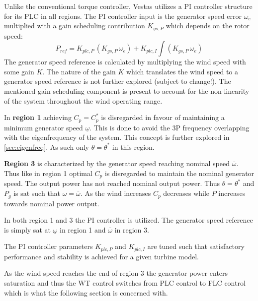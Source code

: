 \medskip
Unlike the conventional torque controller, Vestas utilizes a PI controller structure for its PLC in all regions. The PI controller input is the generator speed error $ \omega_e $ multiplied with a gain scheduling contribution $ K_{gs,P} $ which depends on the rotor speed:
\begin{equation}\label{eq:pi_plc_ctrl}
	P_{ref} = K_{plc,P} \, (K_{gs,P} \, \omega_e ) + K_{plc,I} \int (K_{gs,P} \, \omega_e)
\end{equation}
The generator speed reference is calculated by multiplying the wind speed with some gain $ K $. The nature of the gain $ K $ which translates the wind speed to a generator speed reference is not further explored (subject to change!). The mentioned gain scheduling component is present to account for the non-linearity of the system throughout the wind operating range.

In \textbf{region 1} achieving $ C_p = C_p^* $ is disregarded in favour of maintaining a minimum generator speed $ \underline{\omega} $. This is done to avoid the 3P frequency overlapping with the eigenfrequency of the system. This concept is further explored in \cref{sec:eigenfreq}. As such only $ \theta = \theta^* $ in this region.

\textbf{Region 3} is characterized by the generator speed reaching nominal speed $ \bar{\omega} $. Thus like in region 1 optimal $ C_p $ is disregarded to maintain the nominal generator speed. The output power has not reached nominal output power. Thus $ \theta = \theta^* $ and $ P_g $ is sat such that $ \omega = \bar{\omega} $. As the wind increases $ C_p $ decreases while $ P $ increases towards nominal power output. 

In both region 1 and 3 the PI controller is utilized. The generator speed reference is simply sat at $ \underline{\omega} $ in region 1 and $ \bar{\omega} $ in region 3.

The PI controller parameters $ K_{plc,P} $ and $ K_{plc,I} $ are tuned such that satisfactory performance and stability is achieved for a given turbine model. 

As the wind speed reaches the end of region 3 the generator power enters saturation and thus the WT control switches from PLC control to FLC control which is what the following section is concerned with.


